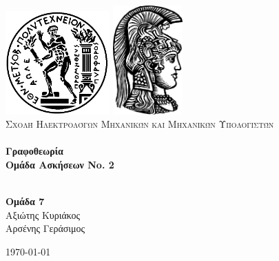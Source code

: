 \begin{titlepage}
\begin{center}

\includegraphics[width=0.3\textwidth]{./pyrforos.png}
\includegraphics[width=0.2\textwidth]{./uoa.png}\\[1cm]

\textsc{\LARGE Σχολή Ηλεκτρολόγων Μηχανικών και Μηχανικών Υπολογιστών}\\[1.5cm]

\HRule \\[0.4cm]
{\huge \bfseries Γραφοθεωρία\\
\LARGE Ομάδα Ασκήσεων No. 2}\\[0.4cm]

\HRule \\[1.5cm]

\begin{center}
\textbf{Ομάδα 7}\\
Αξιώτης Κυριάκος\\
Αρσένης Γεράσιμος
\end{center}

\vfill

{\large \today}
\end{center}

\end{titlepage}
